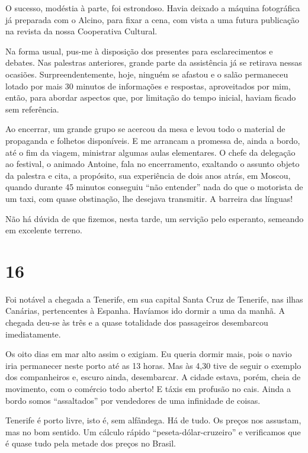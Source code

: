 O sucesso, modéstia à parte, foi estrondoso. Havia deixado a máquina fotográfica já preparada com o Alcino, para fixar a cena, com vista a uma futura publicação na revista da nossa Cooperativa Cultural.

Na forma usual, pus-me à disposição dos presentes para esclarecimentos e debates. Nas palestras anteriores, grande parte da assistência já se retirava nessas ocasiões. Surpreendentemente, hoje, ninguém se afastou e o salão permaneceu lotado por mais 30 minutos de informações e respostas, aproveitados por mim, então, para abordar aspectos que, por limitação do tempo inicial, haviam ficado sem referência.

Ao encerrar, um grande grupo se acercou da mesa e levou todo o material de propaganda e folhetos disponíveis. E me arrancam a promessa de, ainda a bordo, até o fim da viagem, ministrar algumas aulas elementares. O chefe da delegação ao festival, o animado Antoine, fala no encerramento, exaltando o assunto objeto da palestra e cita, a propósito, sua experiência de dois anos atrás, em Moscou, quando durante 45 minutos conseguiu ``não entender'' nada do que o motorista de um taxi, com quase obstinação, lhe desejava transmitir. A barreira das línguas!

Não há dúvida de que fizemos, nesta tarde, um servição pelo esperanto, semeando em excelente terreno.

\section*{16 \adfflatleafright {}}

Foi notável a chegada a Tenerife, em sua capital Santa Cruz de Tenerife, nas ilhas Canárias, pertencentes à Espanha. Havíamos ido dormir a uma da manhã. A chegada deu-se às três e a quase totalidade dos passageiros desembarcou imediatamente.

Os oito dias em mar alto assim o exigiam. Eu queria dormir mais, pois o navio iria permanecer neste porto até as 13 horas. Mas às 4,30 tive de seguir o exemplo dos companheiros e, escuro ainda, desembarcar. A cidade estava, porém, cheia de movimento, com o comércio todo aberto! E táxis em profusão no cais. Ainda a bordo somos ``assaltados'' por vendedores de uma infinidade de coisas.

Tenerife é porto livre, isto é, sem alfândega. Há de tudo. Os preços nos assustam, mas no bom sentido. Um cálculo rápido ``peseta-dólar-cruzeiro'' e verificamos que é quase tudo pela metade dos preços no Brasil.

